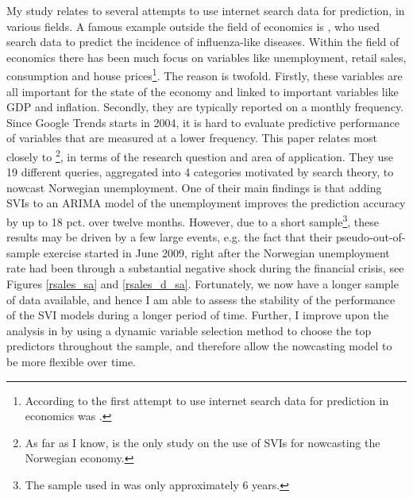 My study relates to several attempts to use internet search data for prediction, in various fields. A famous example outside the field of economics is \textcite{ginsberg2009}, who used search data to predict the incidence of influenza-like diseases. Within the field of economics there has been much focus on variables like unemployment, retail sales, consumption and house prices\footnote{According to \textcite{choi2012} the first attempt to use internet search data for prediction in economics was \textcite{ettredge2005}.}. The reason is twofold. Firstly, these variables are all important for the state of the economy and linked to important variables like GDP and inflation. Secondly, they are typically reported on a monthly frequency. Since Google Trends starts in 2004, it is hard to evaluate predictive performance of variables that are measured at a lower frequency. This paper relates most closely to \textcite{anvik2010}\footnote{As far as I know, \textcite{anvik2010} is the only study on the use of SVIs for nowcasting the Norwegian economy.}, in terms of the research question and area of application. They use 19 different queries, aggregated into 4 categories motivated by search theory, to nowcast Norwegian unemployment. One of their main findings is that adding SVIs to an ARIMA model of the unemployment improves the prediction accuracy by up to 18 pct. over twelve months. However, due to a short sample\footnote{The sample used in \textcite{anvik2010} was only approximately 6 years.}, these results may be driven by a few large events, e.g. the fact that their pseudo-out-of-sample exercise started in June 2009, right after the Norwegian unemployment rate had been through a substantial negative shock during the financial crisis, see Figures \ref{rsales_sa} and \ref{rsales_d_sa}. Fortunately, we now have a longer sample of data available, and hence I am able to assess the stability of the performance of the SVI models during a longer period of time. Further, I improve upon the analysis in \textcite{anvik2010} by using a dynamic variable selection method to choose the top predictors throughout the sample, and therefore allow the nowcasting model to be more flexible over time.

